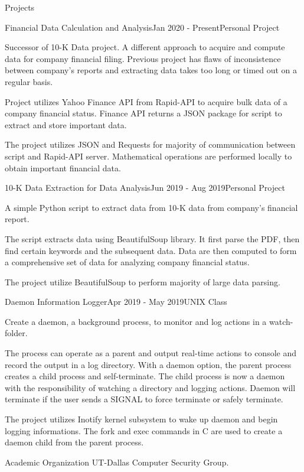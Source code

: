 \documentclass{resume} %
\begin{document}
\begin{rSection}{Projects}
    \begin{rSubsection}{Financial Data Calculation and Analysis}{Jan 2020 - Present}{Personal Project}{}
        \item Successor of 10-K Data project. A different approach to acquire and compute data for company financial filing. Previous project has flaws of inconsistence between company's reports and extracting data takes too long or timed out on a regular basis.
        \item Project utilizes Yahoo Finance API from Rapid-API to acquire bulk data of a company financial status. Finance API returns a JSON package for script to extract and store important data.
        \item The project utilizes JSON and Requests for majority of communication between script and Rapid-API server. Mathematical operations are performed locally to obtain important financial data.
    \end{rSubsection}
    
    \begin{rSubsection}{10-K Data Extraction for Data Analysis}{Jun 2019 - Aug 2019}{Personal Project}{}
        \item A simple Python script to extract data from 10-K data from company's financial report.
        \item The script extracts data using BeautifulSoup library. It first parse the PDF, then find certain keywords and the subsequent data. Data are then computed to form a comprehensive set of data for analyzing company financial status.
        \item The project utilize BeautifulSoup to perform majority of large data parsing.
    \end{rSubsection}
    
    \begin{rSubsection}{Daemon Information Logger}{Apr 2019 - May 2019}{UNIX Class}{}
        \item Create a daemon, a background process, to monitor and log actions in a watch-folder.
        \item The process can operate as a parent and output real-time actions to console and record the output in a log directory. With a daemon option, the parent process creates a child process and self-terminate. The child process is now a daemon with the responsibility of watching a directory and logging actions. Daemon will terminate if the user sends a SIGNAL to force terminate or safely terminate. 
        \item The project utilizes Inotify kernel subsystem to wake up daemon and begin logging informations. The fork and exec commands in C are used to create a daemon child from the parent process.
    \end{rSubsection}
\end{rSection}


\begin{rSection}{Academic Organization} 
    UT-Dallas Computer Security Group.
\end{rSection}
\end{document}

